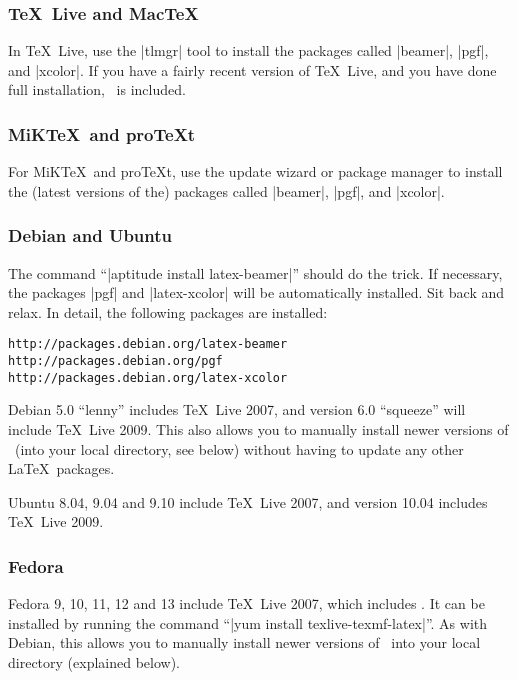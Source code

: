 \subsubsection{\TeX\ Live and Mac\TeX}

In \TeX\ Live, use the |tlmgr| tool to install the packages called |beamer|, |pgf|, and |xcolor|. If you have a fairly recent version of \TeX\ Live, and you have done full installation, \beamer\ is included.


\subsubsection{MiK\TeX\ and pro\TeX t}

For MiK\TeX\ and pro\TeX t, use the update wizard or package manager to install the (latest versions of the) packages called |beamer|, |pgf|, and |xcolor|.


\subsubsection{Debian and Ubuntu}

The command ``|aptitude install latex-beamer|'' should do the trick. If necessary, the packages |pgf| and |latex-xcolor| will be automatically installed. Sit back and relax. In detail, the following packages are installed:
\begin{verbatim}
http://packages.debian.org/latex-beamer
http://packages.debian.org/pgf
http://packages.debian.org/latex-xcolor
\end{verbatim}

Debian 5.0 ``lenny'' includes \TeX\ Live 2007, and version 6.0 ``squeeze'' will include \TeX\ Live 2009. This also allows you to manually install newer versions of \beamer\ (into your local directory, see below) without having to update any other \LaTeX\ packages.

Ubuntu 8.04, 9.04 and 9.10 include \TeX\ Live 2007, and version 10.04 includes \TeX\ Live 2009.


\subsubsection{Fedora}

Fedora 9, 10, 11, 12 and 13 include \TeX\ Live 2007, which includes \beamer. It can be installed by running the command ``|yum install texlive-texmf-latex|''. As with Debian, this allows you to manually install newer versions of \beamer\ into your local directory (explained below).

